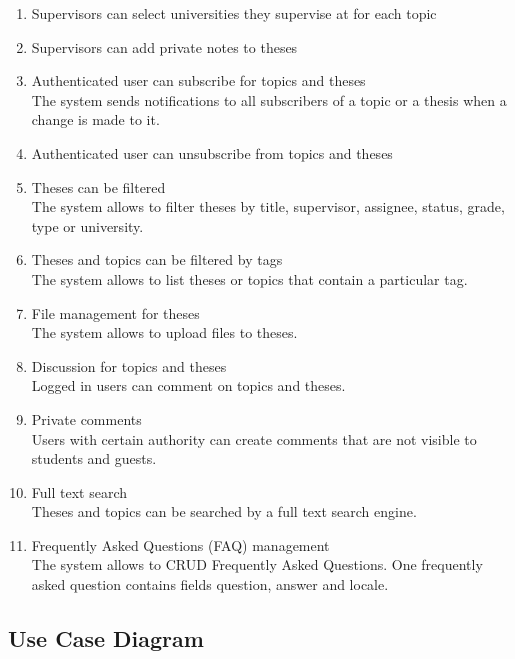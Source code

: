 \begin{enumerate}
    \item Supervisors can select universities they supervise at for each topic

    \item Supervisors can add private notes to theses

    \item Authenticated user can subscribe for topics and theses\\
    The system sends notifications to all subscribers of a topic or a thesis when a change is made to it.

    \item Authenticated user can unsubscribe from topics and theses

    \item Theses can be filtered\\
    The system allows to filter theses by title, supervisor, assignee, status, grade, type or university.

    \item Theses and topics can be filtered by tags\\
    The system allows to list theses or topics that contain a particular tag.

    \item File management for theses\\
    The system allows to upload files to theses.

    \item Discussion for topics and theses\\
    Logged in users can comment on topics and theses.

    \item Private comments\\
    Users with certain authority can create comments that are not visible to students and guests.

    \item Full text search\\
    Theses and topics can be searched by a full text search engine.

    \item Frequently Asked Questions (FAQ) management\\
    The system allows to CRUD Frequently Asked Questions. One frequently asked question contains fields question, answer and locale.

\end{enumerate}

\subsection{Use Case Diagram}

